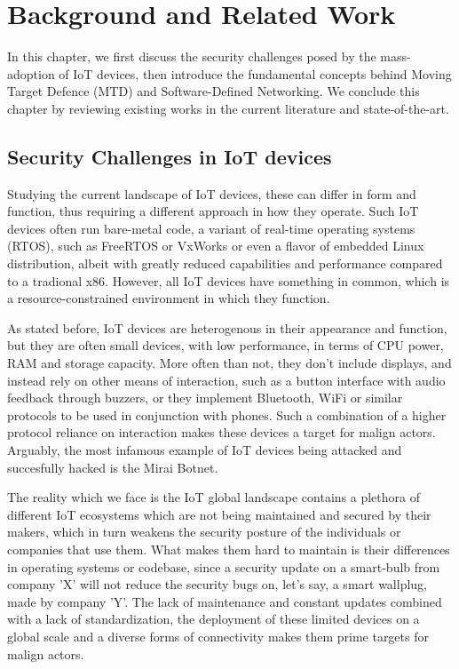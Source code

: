 \chapter{Background and Related Work}
\label{chap:soa}
In this chapter, we first discuss the security challenges posed by the mass-adoption of IoT devices, then introduce the fundamental concepts behind Moving Target Defence (MTD) and Software-Defined Networking. We conclude this chapter by reviewing existing works in the current literature and state-of-the-art.


\section{Security Challenges in IoT devices}
Studying the current landscape of IoT devices, these can differ in form and function, thus requiring a different approach in how they operate. Such IoT devices often run bare-metal code, a variant of real-time operating systems (RTOS), such as FreeRTOS or VxWorks or even a flavor of embedded Linux distribution, albeit with greatly reduced capabilities and performance compared to a tradional x86. However, all IoT devices have something in common, which is a resource-constrained environment in which they function.

As stated before, IoT devices are heterogenous in their appearance and function, but they are often small devices, with low performance, in terms of CPU power, RAM and storage capacity. More often than not, they don't include displays, and instead rely on other means of interaction, such as a button interface with audio feedback through buzzers, or they implement Bluetooth, WiFi or similar protocols to be used in conjunction with phones. Such a combination of a higher protocol reliance on interaction makes these devices a target for malign actors. Arguably, the most infamous example of IoT devices being attacked and succesfully hacked is the Mirai Botnet\cite{antonakakis2017}.    

The reality which we face is the IoT global landscape contains a plethora of different IoT ecosystems which are not being maintained and secured by their makers, which in turn weakens the security posture of the individuals or companies that use them. What makes them hard to maintain is their differences in operating systems or codebase, since a security update on a smart-bulb from company 'X' will not reduce the security bugs on, let's say, a smart wallplug, made by company 'Y'. The lack of maintenance and constant updates combined with a lack of standardization, the deployment of these limited devices on a global scale and a diverse forms of connectivity makes them prime targets for malign actors.

